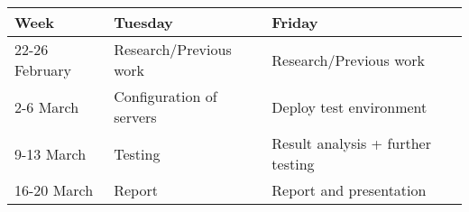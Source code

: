 \begin{center}
  \begin{tabular}{ l | l | l }
    \hline
     Week & Tuesday & Friday \\ \hline
     22-26 February & Research/Previous work & Research/Previous work  \\ \hline
     2-6 March & Configuration of servers & Deploy test environment  \\
    \hline
     9-13 March & Testing & Result analysis + further testing  \\ \hline
     16-20 March & Report & Report and presentation  \\ \hline
  \end{tabular}
\end{center}
